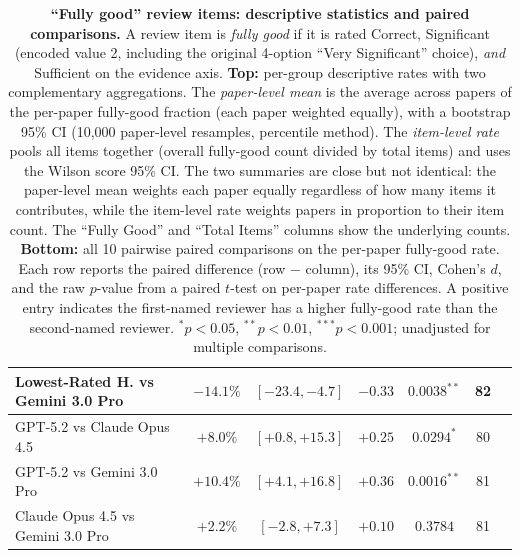 \begin{table}[t]
\begin{tabular}{l cc cc cc}
Lowest-Rated H. vs Gemini 3.0 Pro & $-14.1\%$ & {\scriptsize $[-23.4, -4.7]$}   & $-0.33$ & $0.0038^{**}$   & 82 & \\
\midrule
GPT-5.2 vs Claude Opus 4.5        & $+8.0\%$  & {\scriptsize $[+0.8, +15.3]$}    & $+0.25$ & $0.0294^{*}$   & 80 & \\
GPT-5.2 vs Gemini 3.0 Pro         & $+10.4\%$ & {\scriptsize $[+4.1, +16.8]$}    & $+0.36$ & $0.0016^{**}$  & 81 & \\
Claude Opus 4.5 vs Gemini 3.0 Pro & $+2.2\%$  & {\scriptsize $[-2.8, +7.3]$}     & $+0.10$ & $0.3784$       & 81 & \\
\bottomrule
\end{tabular}
\caption{\textbf{``Fully good'' review items: descriptive statistics and paired comparisons.}
A review item is \emph{fully good} if it is rated Correct, Significant (encoded value 2, including the original 4-option ``Very Significant'' choice), \emph{and} Sufficient on the evidence axis.
\textbf{Top:} per-group descriptive rates with two complementary aggregations.
The \emph{paper-level mean} is the average across papers of the per-paper fully-good fraction (each paper weighted equally), with a bootstrap 95\% CI (10{,}000 paper-level resamples, percentile method).
The \emph{item-level rate} pools all items together (overall fully-good count divided by total items) and uses the Wilson score 95\% CI.
The two summaries are close but not identical: the paper-level mean weights each paper equally regardless of how many items it contributes, while the item-level rate weights papers in proportion to their item count.
The ``Fully Good'' and ``Total Items'' columns show the underlying counts.
\textbf{Bottom:} all 10 pairwise paired comparisons on the per-paper fully-good rate.
Each row reports the paired difference (row $-$ column), its 95\% CI, Cohen's $d$, and the raw $p$-value from a paired $t$-test on per-paper rate differences.
A positive entry indicates the first-named reviewer has a higher fully-good rate than the second-named reviewer.
$^{*}p < 0.05$, $^{**}p < 0.01$, $^{***}p < 0.001$; unadjusted for multiple comparisons.
}
\label{tab:fully-good}
\end{table}
